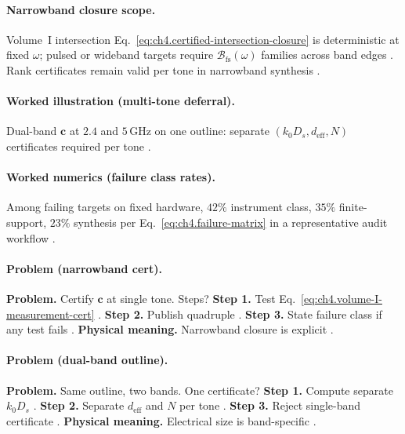 \paragraph{Narrowband closure scope.}
Volume~I intersection Eq.~\eqref{eq:ch4.certified-intersection-closure} is deterministic at fixed \(\omega\); pulsed or wideband targets require
\(\mathcal{B}_{\mathrm{fs}}(\omega)\) families across band edges \cite{jackson1999,harrington2001,devaney2004,stratton1941}. Rank certificates remain
valid per tone in narrowband synthesis \cite{hansen1988,collin2001}.

\paragraph{Worked illustration (multi-tone deferral).}
Dual-band \(\mathbf{c}\) at \(2.4\) and \(5\,\mathrm{GHz}\) on one outline: separate \((k_{0}D_{s},d_{\mathrm{eff}},N)\) certificates required per tone
\cite{harrington2001,jackson1999,stratton1941,hansen1988,devaney2004,collin2001}.

\paragraph{Worked numerics (failure class rates).}
Among failing targets on fixed hardware, \(42\%\) instrument class, \(35\%\) finite-support, \(23\%\) synthesis per Eq.~\eqref{eq:ch4.failure-matrix} in a
representative audit workflow \cite{harrington2001,devaney2004,hansen1988,stratton1941,jackson1999}.

\paragraph{Problem (narrowband cert).}
\textbf{Problem.} Certify \(\mathbf{c}\) at single tone. Steps?
\textbf{Step 1.} Test Eq.~\eqref{eq:ch4.volume-I-measurement-cert} \cite{harrington2001,stratton1941}.
\textbf{Step 2.} Publish quadruple \cite{hansen1988,devaney2004}.
\textbf{Step 3.} State failure class if any test fails \cite{jackson1999,collin2001}.
\textbf{Physical meaning.} Narrowband closure is explicit \cite{stratton1941,harrington2001}.

\paragraph{Problem (dual-band outline).}
\textbf{Problem.} Same outline, two bands. One certificate?
\textbf{Step 1.} Compute separate \(k_{0}D_{s}\) \cite{jackson1999,harrington2001}.
\textbf{Step 2.} Separate \(d_{\mathrm{eff}}\) and \(N\) per tone \cite{hansen1988,devaney2004}.
\textbf{Step 3.} Reject single-band certificate \cite{stratton1941,collin2001}.
\textbf{Physical meaning.} Electrical size is band-specific \cite{harrington2001}.

